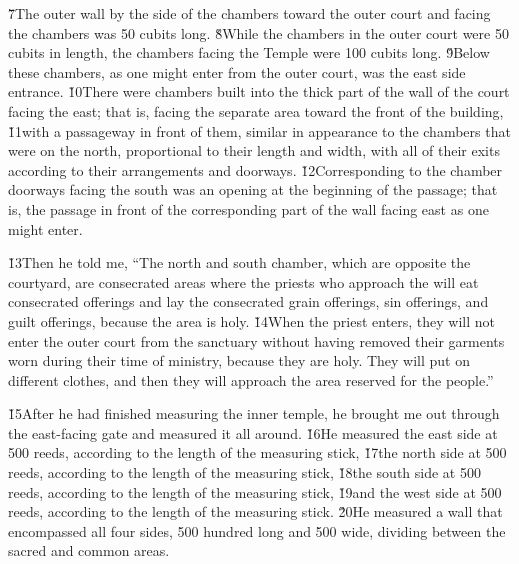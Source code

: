 \v{7}The outer wall by the side of the chambers toward the outer court and facing the chambers was 50 cubits long. \v{8}While the chambers in the outer court were 50 cubits in length, the chambers facing the Temple were 100 cubits long. \v{9}Below these chambers, as one might enter from the outer court, was the east side entrance. \v{10}There were chambers built into the thick part of the wall of the court facing the east; that is, facing the separate area toward the front of the building, \v{11}with a passageway in front of them, similar in appearance to the chambers that were on the north, proportional to their length and width, with all of their exits according to their arrangements and doorways. \v{12}Corresponding to the chamber doorways facing the south was an opening at the beginning of the passage; that is, the passage in front of the corresponding part of the wall facing east as one might enter.

\v{13}Then he told me, ``The north and south chamber, which are opposite the courtyard, are consecrated areas where the priests who approach the  will eat consecrated offerings and lay the consecrated grain offerings, sin offerings, and guilt offerings, because the area is holy. \v{14}When the priest enters, they will not enter the outer court from the sanctuary without having removed their garments worn during their time of ministry, because they are holy. They will put on different clothes, and then they will approach the area reserved for the people.''

\v{15}After he had finished measuring the inner temple, he brought me out through the east-facing gate and measured it all around. \v{16}He measured the east side at 500 reeds, according to the length of the measuring stick, \v{17}the north side at 500 reeds, according to the length of the measuring stick, \v{18}the south side at 500 reeds, according to the length of the measuring stick, \v{19}and the west side at 500 reeds, according to the length of the measuring stick. \v{20}He measured a wall that encompassed all four sides, 500 hundred long and 500 wide, dividing between the sacred and common areas.

